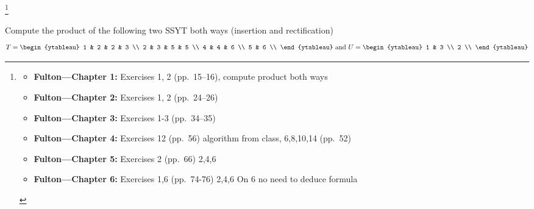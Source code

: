 \documentclass[addpoints,10pt]{exam}
\theoremstyle{plain}
\theoremstyle{definition}
\newtheorem{prob}[thm]{Problem}
\theoremstyle{plain}
\theoremstyle{plain}
\theoremstyle{definition}
\let\oldprob\prob
\let\endoldprob\endprob
\renewenvironment{prob}
  {\begin{singlespace}\oldprob}
  {\endoldprob\end{singlespace}}
\begin{document}
\renewcommand{\thefootnote}{}
\footnote{%
\begin{minipage}{0.95\linewidth}
\begin{itemize}[leftmargin=*,nosep]
    \item \textbf{Fulton—Chapter 1:} Exercises 1, 2 (pp.\ 15--16), compute product both ways
    \item \textbf{Fulton—Chapter 2:} Exercises 1, 2 (pp.\ 24--26)
    \item \textbf{Fulton—Chapter 3:} Exercises 1-3 (pp.\ 34--35)
    \item \textbf{Fulton—Chapter 4:} Exercises 12 (pp.\ 56) algorithm from class, 6,8,10,14 (pp.\ 52)
    \item \textbf{Fulton—Chapter 5:} Exercises 2 (pp.\ 66) 2,4,6
    \item \textbf{Fulton—Chapter 6:} Exercises 1,6 (pp.\ 74-76) 2,4,6 On 6 no need to deduce formula
\end{itemize}
\end{minipage}
}

\setcounter{thm}{0}
\renewcommand{\thethm}{1.\arabic{thm}}
\begin{prob}
Compute the product of the following two SSYT both ways (insertion and rectification) $$T =
\begin{ytableau}
1 & 2 & 2 & 3 \\
2 & 3 & 5 & 5 \\
4 & 4 & 6 \\
5 & 6 \\
\end{ytableau}
\text{ and } U = \begin{ytableau}
1 & 3 \\
2 \\
\end{ytableau}$$
\end{prob}
\end{document}
